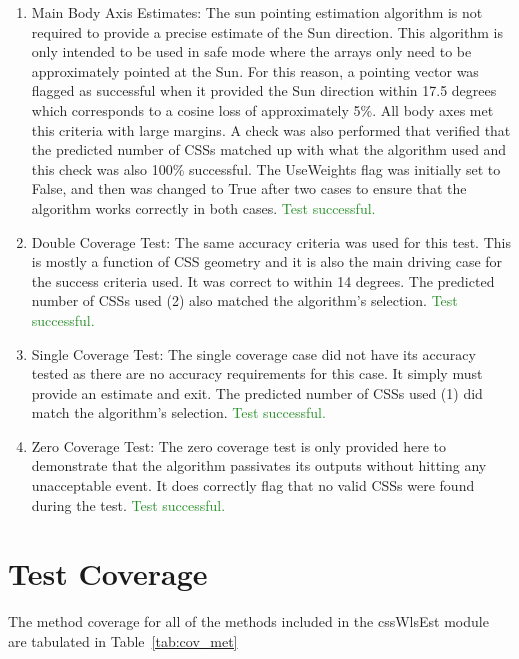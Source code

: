 \documentclass[]{BasiliskReportMemo}
\begin{document}
\begin{enumerate}
\item{Main Body Axis Estimates: The sun pointing estimation algorithm is not 
   required to provide a precise estimate of the Sun direction.  This algorithm 
   is only intended to be used in safe mode where the arrays only need to be 
   approximately pointed at the Sun.  For this reason, a pointing vector 
   was flagged as successful when it provided the Sun direction within 17.5 
   degrees which corresponds to a cosine loss of approximately 5\%.  All body 
   axes met this criteria with large margins.  A check was also performed that 
   verified that the predicted number of CSSs matched up with what the 
   algorithm used and this check was also 100\% successful.  The UseWeights flag 
   was initially set to False, and then was changed to True after two cases to 
   ensure that the algorithm works correctly in both cases. 
    \textcolor{ForestGreen}{Test successful.}}
\item{Double Coverage Test: The same accuracy criteria was used for this test.  
   This is mostly a function of CSS geometry and it is also the main driving 
   case for the success criteria used.  It was correct to within 14 degrees. 
   The predicted number of CSSs used (2) also matched the algorithm's selection. 
    \textcolor{ForestGreen}{Test successful.}}
\item{Single Coverage Test: The single coverage case did not have its accuracy 
   tested as there are no accuracy requirements for this case.  It simply must 
   provide an estimate and exit.  The predicted number of CSSs used (1) did  
   match the algorithm's selection.  \textcolor{ForestGreen}{Test successful.}}
\item{Zero Coverage Test: The zero coverage test is only provided here to 
   demonstrate that the algorithm passivates its outputs without hitting any 
   unacceptable event.  It does correctly flag that no valid CSSs were found 
   during the test. \textcolor{ForestGreen}{Test successful.}}
\end{enumerate}

\section{Test Coverage}
The method coverage for all of the methods included in the cssWlsEst 
module are tabulated in Table~\ref{tab:cov_met}
\end{document}
